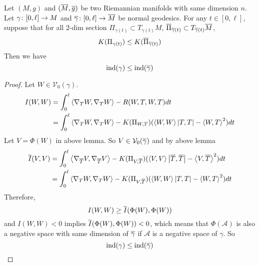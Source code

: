 \begin{enumerate}[label=\arabic{*}.]
	\begin{thm}\label{thm:transind}
		Let $(M,g)$ and $(\overline{M},\overline{g})$ be two Riemannian manifolds with same dimension $n$. Let $\gamma \colon [0,\ell] \rightarrow M$ and $\overline{\gamma} \colon [0,\ell] \rightarrow \overline{M}$ be normal geodesics. For any $t \in [0,\ell]$, suppose that for all $2$-dim section $\Pi_{\gamma(t)} \subset T_{\gamma(t)}M$, $\overline{\Pi}_{\overline{\gamma}(t)} \subset T_{\overline{\gamma}(t)}\overline{M}$,
		\begin{equation*}
			K(\Pi_{\gamma(t)}) \leq K(\overline{\Pi}_{\overline{\gamma}(t)})
		\end{equation*}
		Then we have
		\begin{equation*}
			\operatorname{ind}(\gamma) \leq \operatorname{ind}(\overline{\gamma})
		\end{equation*}
	\end{thm}
	\begin{proof}
		Let $W \in \mathcal{V}_0(\gamma)$.
		\begin{equation*}
			\begin{aligned}
				I(W,W) &= \int_0^\ell \left\langle \nabla_T W,\nabla_TW \right\rangle - R(W,T,W,T)dt\\
				&= \int_0^\ell \left\langle \nabla_T W,\nabla_TW \right\rangle - K(\Pi_{W,T})(\left\langle W,W \right\rangle\left\lvert T,T\right\lvert-\left\langle W,T \right\rangle^2)dt
			\end{aligned}
		\end{equation*}
		Let $V = \Phi(W)$ in above lemma. So $V \in \mathcal{V}_0(\overline{\gamma})$ and by above lemma
		\begin{equation*}
			\begin{aligned}
				\overline{I}(V,V) &= \int_0^\ell \left\langle \nabla_{\overline{T}} V,\nabla_{\overline{T}}V \right\rangle - K(\Pi_{V,{\overline{T}}})(\left\langle V,V \right\rangle\left\lvert{\overline{T}},{\overline{T}}\right\lvert-\left\langle V,{\overline{T}} \right\rangle^2)dt \\
				&= \int_0^\ell \left\langle \nabla_T W,\nabla_TW \right\rangle - K(\Pi_{V,{\overline{T}}})(\left\langle W,W \right\rangle\left\lvert T,T\right\lvert-\left\langle W,T \right\rangle^2)dt
			\end{aligned}
		\end{equation*}
		Therefore,
		\begin{equation*}
			I(W,W) \geq \overline{I}(\Phi(W),\Phi(W))
		\end{equation*}
		and $I(W,W) < 0$ implies $\overline{I}(\Phi(W),\Phi(W)) < 0$, which means that $\Phi(\mathcal{A})$ is also a negative space with same dimension of $\overline{\gamma}$ if $\mathcal{A}$ is a negative space of $\gamma$. So
		\begin{equation*}
			\operatorname{ind}(\gamma) \leq \operatorname{ind}(\overline{\gamma}) \qedhere
		\end{equation*}
	\end{proof}


\end{enumerate}
